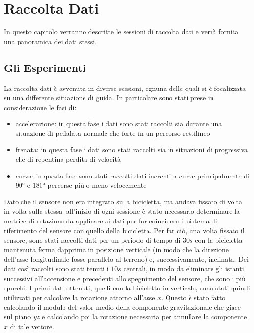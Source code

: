 \documentclass[12pt]{article}
\begin{document}
\section{Raccolta Dati}
	In questo capitolo verranno descritte le sessioni di raccolta dati e verrà fornita una panoramica dei dati stessi.
	
	\subsection{Gli Esperimenti}
	La raccolta dati è avvenuta in diverse sessioni, ognuna delle quali si è focalizzata su una differente situazione di guida. In particolare sono stati prese in considerazione le fasi di:
	\begin{itemize}
		\item accelerazione: in questa fase i dati sono stati raccolti sia durante una situazione di pedalata normale che forte in un percorso rettilineo
		\item frenata: in questa fase i dati sono stati raccolti sia in situazioni di progressiva che di repentina perdita di velocità
		\item curva: in questa fase sono stati raccolti dati inerenti a curve principalmente di 90° e 180° percorse più o meno velocemente
	\end{itemize}
	
	Dato che il sensore non era integrato sulla bicicletta, ma andava fissato di volta in volta sulla stessa, all'inizio di ogni sessione è stato necessario determinare la matrice di rotazione da applicare ai dati per far coincidere il sistema di riferimento del sensore con quello della bicicletta. Per far ciò, una volta fissato il sensore, sono stati raccolti dati per un periodo di tempo di \(30s\) con la bicicletta mantenuta ferma dapprima in posizione verticale (in modo che la direzione dell'asse longitudinale fosse parallelo al terreno) e, successivamente, inclinata. Dei dati così raccolti sono stati tenuti i \(10s\) centrali, in modo da eliminare gli istanti successivi all'accensione e precedenti allo spegnimento del sensore, che sono i più sporchi. I primi dati ottenuti, quelli con la bicicletta in verticale, sono stati quindi utilizzati per calcolare la rotazione attorno all'asse \(x\). Questo è stato fatto calcolando il modulo del valor medio della componente gravitazionale che giace sul piano \(yz\) e calcolando poi la rotazione necessaria per annullare la componente \(x\) di tale vettore.
	
\end{document}
